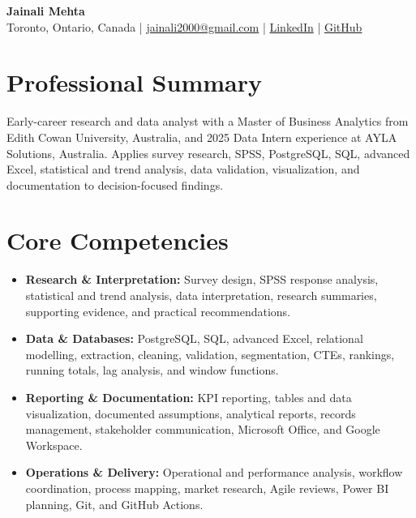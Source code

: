 \documentclass[letterpaper,10pt]{article}
\begin{document}
\begin{center}
  {\fontsize{17}{19}\selectfont\textbf{Jainali Mehta}}\\[2pt]
  \small Toronto, Ontario, Canada \;|\;
  \href{mailto:jainali2000@gmail.com}{jainali2000@gmail.com} \;|\;
  \href{https://www.linkedin.com/in/jainali-mehta}{LinkedIn} \;|\;
  \href{https://github.com/jainalimehta}{GitHub}
\end{center}
\vspace{-7pt}

\section{Professional Summary}
\small Early-career research and data analyst with a Master of Business Analytics from Edith Cowan University, Australia, and 2025 Data Intern experience at AYLA Solutions, Australia. Applies survey research, SPSS, PostgreSQL, SQL, advanced Excel, statistical and trend analysis, data validation, visualization, and documentation to decision-focused findings.

\section{Core Competencies}
\begin{itemize}[leftmargin=0.16in,label=\textbullet,topsep=0pt,itemsep=1pt,parsep=0pt]
  \item \small \textbf{Research \& Interpretation:} Survey design, SPSS response analysis, statistical and trend analysis, data interpretation, research summaries, supporting evidence, and practical recommendations.
  \item \small \textbf{Data \& Databases:} PostgreSQL, SQL, advanced Excel, relational modelling, extraction, cleaning, validation, segmentation, CTEs, rankings, running totals, lag analysis, and window functions.
  \item \small \textbf{Reporting \& Documentation:} KPI reporting, tables and data visualization, documented assumptions, analytical reports, records management, stakeholder communication, Microsoft Office, and Google Workspace.
  \item \small \textbf{Operations \& Delivery:} Operational and performance analysis, workflow coordination, process mapping, market research, Agile reviews, Power BI planning, Git, and GitHub Actions.
\end{itemize}
\end{document}
